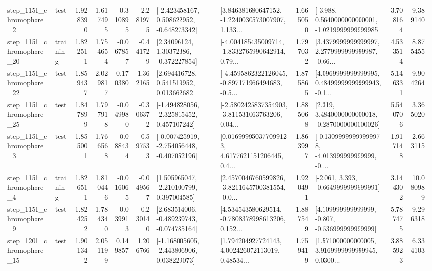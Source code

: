 \begin{tabular}{llrrrrllrlrr}
  step\_1151\_chromophore\_2 &      test &      1.928390 &    1.617495 &     -0.310895 & -2.281975 &   [-2.423458167, 0.508622952, -0.648273342] &  [3.846381680647152, -1.2240030573007907, 1.133... &       1.665050 &  [-3.988, 0.5640000000000001, -1.0219999999999985] &            3.708164 &          9.389140 \\
 step\_1151\_chromophore\_20 &  training &      1.822511 &    1.754654 &     -0.067857 & -0.441729 &      [2.34096124, 1.30372386, -0.372227854] &  [-4.004185435009714, -1.8332765990642914, 0.79... &       1.797032 &  [3.4379999999999997, 2.2779999999999987, -0.66... &            4.533514 &          8.875455 \\
 step\_1151\_chromophore\_22 &      test &      1.859437 &    2.029817 &      0.170380 &  1.362165 &     [2.694416728, 0.541519952, 0.013662682] &  [-4.4595862322126045, -0.897171966494683, -0.5... &       1.875865 &  [4.0969999999999995, 0.48499999999999943, -0.1... &            5.146331 &          9.904264 \\
 step\_1151\_chromophore\_25 &      test &      1.847899 &    1.797918 &     -0.049980 & -0.306372 &   [-1.494828056, -2.325815452, 0.457107242] &  [-2.5802425837354903, -3.811531063763206, 0.04... &       1.885068 &   [2.319, 3.4840000000000018, -0.2870000000000026] &            5.540706 &          3.365020 \\
  step\_1151\_chromophore\_3 &      test &      1.855001 &    1.766568 &     -0.088434 & -0.597533 &  [-0.007425919, -2.754056448, -0.407052196] &  [0.016999950377099123, 4.6177621151206445, 0.4... &       1.863997 &  [-0.13099999999999978, -4.013999999999999, -0.... &            1.917148 &          2.663115 \\
  step\_1151\_chromophore\_4 &  training &      1.826511 &    1.810446 &     -0.016065 & -0.049567 &    [1.505965047, -2.210100799, 0.397004585] &  [2.4570046760599826, -3.8211645700381554, -0.0... &       1.920491 &               [-2.061, 3.393, -0.6649999999999991] &            3.144302 &         10.080989 \\
  step\_1151\_chromophore\_9 &      test &      1.824252 &    1.784340 &     -0.039913 & -0.230140 &   [2.683514006, -0.489239743, -0.074785164] &  [4.534543580629514, -0.7808378998613206, 0.152... &       1.887549 &    [4.109999999999999, -0.807, -0.536999999999999] &            5.787475 &          9.296318 \\
 step\_1201\_chromophore\_15 &      test &      1.901342 &    2.051199 &      0.149857 &  1.206766 &   [-1.168005605, -2.443806906, 0.038229073] &  [1.794204927724143, 4.002426072113019, 0.48534... &       1.759419 &  [1.571000000000005, 3.9169999999999945, 0.0300... &            3.885923 &          6.334103 \\

\end{tabular}
